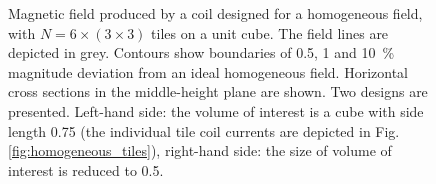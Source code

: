 \begin{figure}
  \centering
  \caption{Magnetic field produced by a coil designed for a homogeneous field, with $N = 6 \times (3 \times 3)$ tiles on a unit cube. The field lines are depicted in grey. Contours show boundaries of \num{0.5}, \num{1} and \SI{10}{\percent} magnitude deviation from an ideal homogeneous field. Horizontal cross sections in the middle-height plane are shown. Two designs are presented. Left-hand side: the volume of interest is a cube with side length \num{0.75} (the individual tile coil currents are depicted in Fig.\,\ref{fig:homogeneous_tiles}), right-hand side: the size of volume of interest is reduced to \num{0.5}.}\label{fig:homogeneous_performance}
\end{figure}

